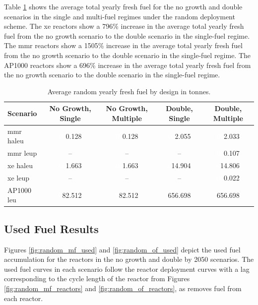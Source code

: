 Table \ref{tab:random_fresh_avg} shows the average total yearly fresh fuel for the no growth and double scenarios in the single and multi-fuel regimes under the random deployment scheme. The \gls{xe} reactors show a 796\% increase in the average total yearly fresh fuel from the no growth scenario to the double scenario in the single-fuel regime. The \gls{mmr} reactors show a 1505\% increase in the average total yearly fresh fuel from the no growth scenario to the double scenario in the single-fuel regime. The AP1000 reactors show a 696\% increase in the average total yearly fresh fuel from the no growth scenario to the double scenario in the single-fuel regime.

\begin{table}[H]
    \centering
    \caption{Average random yearly fresh fuel by design in tonnes.}
    \label{tab:random_fresh_avg}
    \begin{tabular}{l c c c c}
       \hline
       Scenario & No Growth, Single & No Growth, Multiple & Double, Single & Double, Multiple  \\
       \hline
       \gls{mmr} \gls{haleu}   & \textcolor{white}{00}0.128    & \textcolor{white}{00}0.128   & \textcolor{white}{00}2.055    & \textcolor{white}{00}2.033    \\
       \gls{mmr} \gls{leup}    & --       & --      & --       & \textcolor{white}{00}0.107    \\
       \gls{xe} \gls{haleu}    & \textcolor{white}{00}1.663    & \textcolor{white}{00}1.663   & \textcolor{white}{0}14.904   & \textcolor{white}{0}14.806   \\
       \gls{xe} \gls{leup}     & --       & --      & --       & \textcolor{white}{00}0.022    \\
       AP1000 \gls{leu}        & \textcolor{white}{0}82.512   & \textcolor{white}{0}82.512  & 656.698  & 656.698  \\
       \hline
    \end{tabular}
\end{table}





\subsection{Used Fuel Results}
\label{sec:random_used}

Figures \ref{fig:random_mf_used} and \ref{fig:random_of_used} depict the used fuel accumulation for the reactors in the no growth and double by 2050 scenarios. The used fuel curves in each scenario follow the reactor deployment curves with a lag corresponding to the cycle length of the reactor from Figures \ref{fig:random_mf_reactors} and \ref{fig:random_of_reactors}, as \cyclus removes fuel from each reactor.


